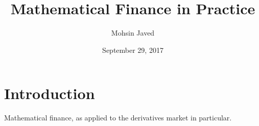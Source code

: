 \documentclass{amsart}
\theoremstyle{plain}
\numberwithin{equation}{section}
\begin{document}
\title[Math Finance]{Mathematical Finance in Practice}
\author{Mohsin Javed}
\address[London]
{Pret A Manger, Marble Arch Station, \newline%
\indent Oxford Street, London}%
%
\date{September 29, 2017}


\maketitle

\section{Introduction}
Mathematical finance, as applied to the 
derivatives market in particular.
\end{document}
